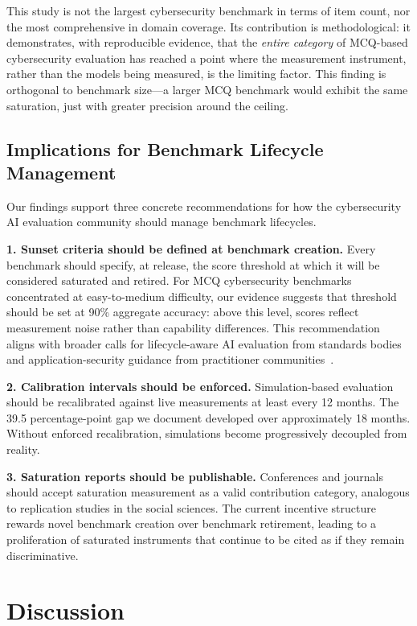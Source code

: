 \documentclass[journal]{IEEEtran}
\begin{document}
This study is not the largest cybersecurity benchmark in terms of item count, nor the most comprehensive in domain coverage. Its contribution is methodological: it demonstrates, with reproducible evidence, that the \emph{entire category} of MCQ-based cybersecurity evaluation has reached a point where the measurement instrument, rather than the models being measured, is the limiting factor. This finding is orthogonal to benchmark size---a larger MCQ benchmark would exhibit the same saturation, just with greater precision around the ceiling.

\subsection{Implications for Benchmark Lifecycle Management}

Our findings support three concrete recommendations for how the cybersecurity AI evaluation community should manage benchmark lifecycles.

\textbf{1. Sunset criteria should be defined at benchmark creation.} Every benchmark should specify, at release, the score threshold at which it will be considered saturated and retired. For MCQ cybersecurity benchmarks concentrated at easy-to-medium difficulty, our evidence suggests that threshold should be set at 90\% aggregate accuracy: above this level, scores reflect measurement noise rather than capability differences. This recommendation aligns with broader calls for lifecycle-aware AI evaluation from standards bodies~\cite{nist2023airmf} and application-security guidance from practitioner communities~\cite{owasp2024llm,mitre2024atlas}.

\textbf{2. Calibration intervals should be enforced.} Simulation-based evaluation should be recalibrated against live measurements at least every 12 months. The 39.5 percentage-point gap we document developed over approximately 18 months. Without enforced recalibration, simulations become progressively decoupled from reality.

\textbf{3. Saturation reports should be publishable.} Conferences and journals should accept saturation measurement as a valid contribution category, analogous to replication studies in the social sciences. The current incentive structure rewards novel benchmark creation over benchmark retirement, leading to a proliferation of saturated instruments that continue to be cited as if they remain discriminative.

\section{Discussion}
\end{document}
